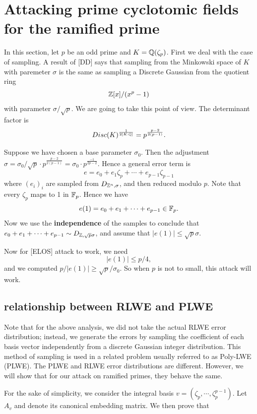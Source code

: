 \documentclass{amsart}
\begin{document}
\section{Attacking prime cyclotomic fields for the ramified prime}

In this section, let $p$ be an odd prime and $K = \mathbb{Q}(\zeta_p)$. First we deal with the case of sampling. A result of [DD] says that sampling from the Minkowski space of $K$ with paremeter $\sigma$ is the same as sampling a Discrete Gaussian from the quotient ring
\[
    \mathbb{Z}[x]/(x^p-1)
\]
with parameter $\sigma/\sqrt{p}$. We are going to take this point of view. The determinant factor is
$$Disc(K)^{\frac{1}{2[K:\mathbb{Q}]}} = p^{\frac{p-2}{2(p-1)}}.$$

Suppose we have chosen a base parameter $\sigma_0$. Then the adjustment $\sigma = \sigma_0/\sqrt{p} \cdot p^{\frac{p-2}{2(p-1)}} = \sigma_0 \cdot p^{\frac{-1}{2p-2}}$. Hence a general error term is
\[
    e = e_0 + e_1 \zeta_p + \cdots + e_{p-1} \zeta_{p-1}
\]
where $(e_i)_i$ are sampled from $D_{\mathbb{Z}^n, \sigma}$, and then reduced modulo $p$. Note that every $\zeta_p$ maps to 1 in $\mathbb{F}_p$. Hence we have
\[
    e(1) = e_0 + e_1 + \cdots +e_{p-1} \in \mathbb{F}_p.
\]
Now we use the {\bf independence} of the samples to conclude that $e_0 + e_1 + \cdots +e_{p-1} \sim D_{\mathbb{Z},\sqrt{p}\sigma}$, and assume that $|e(1)| \leq \sqrt{p}\sigma$.

Now for [ELOS] attack to work, we need
\[
    |e(1)| \leq p/4,
\]
and we computed $p/|e(1)| \geq \sqrt{p}/\sigma_0$. So when $p$ is not to small, this attack will work.

\subsection{relationship between RLWE and PLWE}

Note that for the above analysis, we did not take the actual RLWE error distribution; instead, we generate the errors by sampling the coefficient of each basis vector independently
from a discrete Gaussian integer distribution. This method of sampling is used in a related problem usually referred to as Poly-LWE (PLWE). The PLWE and RLWE error distributions are different. However, we will show that for our attack on ramified primes, they behave the same.


For the sake of simplicity, we consider the integral basis  $v = (\zeta_p, \cdots, \zeta_{p}^{p-1})$. Let $A_v$ and  denote its canonical embedding matrix. We then prove that
\end{document}
